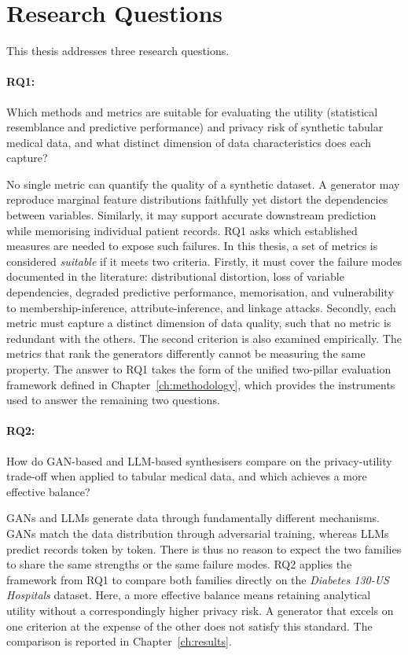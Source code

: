 \section{Research Questions}
\label{sec:intro:rqs}

This thesis addresses three research questions.

\paragraph{RQ1:}
\label{rq:rq1} Which methods and metrics are suitable for evaluating the
utility (statistical resemblance and predictive performance) and privacy risk
of synthetic tabular medical data, and what distinct dimension of data
characteristics does each capture?

No single metric can quantify the quality of a synthetic dataset. A
generator may reproduce marginal feature distributions faithfully yet distort
the dependencies between variables. Similarly, it may support accurate
downstream prediction while memorising individual patient records. RQ1
asks which established measures are needed to expose such failures.
In this thesis, a set of metrics is considered \emph{suitable} if it meets
two criteria. Firstly, it must cover the failure modes documented in the
literature: distributional distortion, loss of variable dependencies,
degraded predictive performance, memorisation, and vulnerability to
membership-inference, attribute-inference, and linkage attacks. Secondly, each
metric must capture a distinct dimension of data quality, such that no metric
is redundant with the others. The second criterion is also examined
empirically. The metrics that rank the generators differently cannot be measuring
the same property. The answer to RQ1 takes the form of the unified two-pillar
evaluation framework defined in Chapter~\ref{ch:methodology}, which provides
the instruments used to answer the remaining two questions.

\paragraph{RQ2:}
\label{rq:rq2} How do GAN-based and LLM-based synthesisers compare on the
privacy-utility trade-off when applied to tabular medical data, and which
achieves a more effective balance?

GANs and LLMs generate data through fundamentally different mechanisms.
GANs match the data distribution through adversarial training, whereas LLMs
predict records token by token. There is thus no reason to expect the two
families to share the same strengths or the same failure modes. RQ2 applies
the framework from RQ1 to compare both families directly on the
\emph{Diabetes 130-US Hospitals} dataset. Here, a more effective balance
means retaining analytical utility without a correspondingly higher privacy
risk. A generator that excels on one criterion at the expense of the other
does not satisfy this standard. The comparison is reported in
Chapter~\ref{ch:results}.

